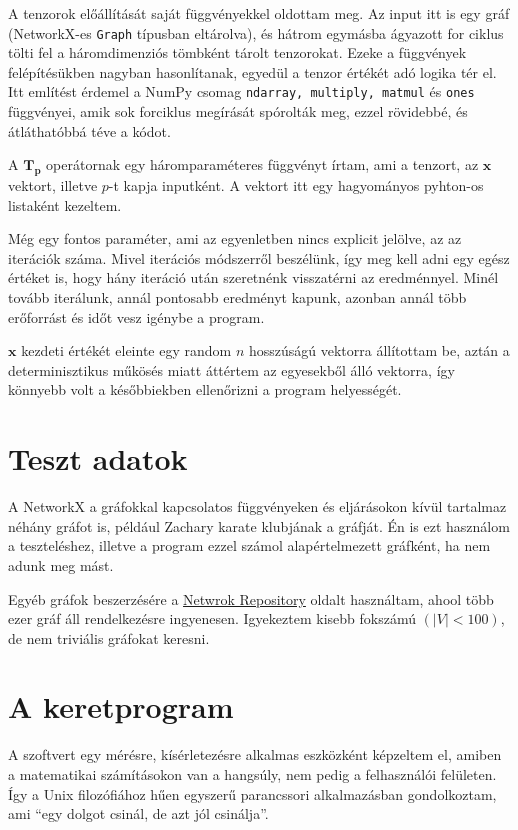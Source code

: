 \documentclass[12pt,numbers=noenddot]{report}
\begin{document}
A tenzorok előállítását saját függvényekkel oldottam meg. 
Az input itt is egy gráf (NetworkX-es \texttt{Graph} típusban eltárolva),
és hátrom egymásba ágyazott for ciklus tölti fel a háromdimenziós tömbként tárolt tenzorokat.
Ezeke a függvények felépítésükben nagyban hasonlítanak, egyedül a tenzor értékét adó logika tér el.
Itt említést érdemel a NumPy csomag \texttt{ndarray, multiply, matmul} és \texttt{ones} függvényei,
amik sok forciklus megírását spórolták meg, ezzel rövidebbé, és átláthatóbbá téve a kódot.

A $\boldsymbol{T_p}$ operátornak egy háromparaméteres függvényt írtam, ami a tenzort, 
az $\boldsymbol{x}$ vektort, illetve $p$-t kapja inputként. 
A vektort itt egy hagyományos pyhton-os listaként kezeltem.

Még egy fontos paraméter, ami az egyenletben nincs explicit jelölve, az az iterációk száma.
Mivel iterációs módszerről beszélünk, így meg kell adni egy egész értéket is, 
hogy hány iteráció után szeretnénk visszatérni az eredménnyel. Minél tovább iterálunk,
annál pontosabb eredményt kapunk, azonban annál több erőforrást és időt vesz igénybe a program.

$\boldsymbol{x}$ kezdeti értékét eleinte egy random $n$ hosszúságú vektorra állítottam be,
aztán a determinisztikus műkösés miatt áttértem az egyesekből álló vektorra, így 
könnyebb volt a későbbiekben ellenőrizni a program helyességét.


\section{Teszt adatok}

A NetworkX a gráfokkal kapcsolatos függvényeken és eljárásokon kívül 
tartalmaz néhány gráfot is, például Zachary karate klubjának a gráfját.
Én is ezt használom a teszteléshez, illetve a program ezzel számol 
alapértelmezett gráfként, ha nem adunk meg mást.

Egyéb gráfok beszerzésére a \href{https://networkrepository.com/index.php}{Netwrok Repository}
oldalt használtam, ahool több ezer gráf áll rendelkezésre ingyenesen. 
Igyekeztem kisebb fokszámú $(|V|<100)$, de nem triviális gráfokat keresni.


\section{A keretprogram}
A szoftvert egy mérésre, kísérletezésre alkalmas eszközként képzeltem el,
amiben a matematikai számításokon van a hangsúly, nem pedig a felhasználói felületen.
Így a Unix filozófiához hűen egyszerű parancssori alkalmazásban gondolkoztam,
ami ``egy dolgot csinál, de azt jól csinálja''.
\end{document}
